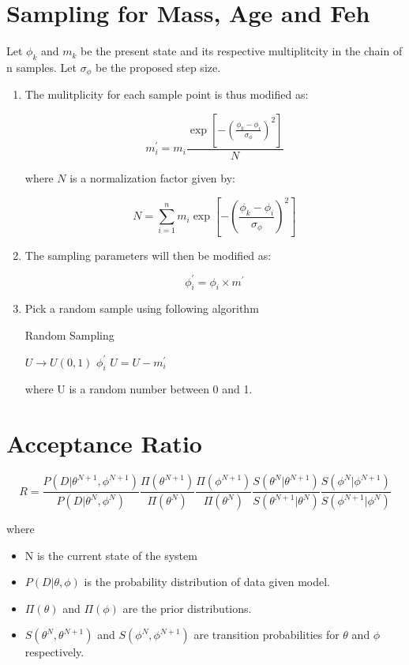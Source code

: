 \documentclass{article}
\begin{document}
\section{Sampling for Mass, Age and Feh}

Let $\phi_k$ and $m_k$ be the present state and its respective multiplitcity in the chain of n samples. Let $\sigma_{\phi}$ be the proposed step size. 

\begin{enumerate}
\item The mulitplicity for each sample point is thus modified as:

$$m_i^{\prime} = m_i  \dfrac{\exp \left[ -\left(\frac{\phi_k - \phi_i}{\sigma_{\phi}}\right)^2 \right]}{N}$$

where $N$ is a normalization factor given by:

$$N = \sum_{i=1}^n m_i  \exp \left[ -\left(\frac{\phi_k - \phi_i}{\sigma_{\phi}}\right)^2 \right]$$

\item The sampling parameters will then be modified as:

$$\phi_i^{\prime} = \phi_i \times m^{\prime}$$

\item Pick a random sample using following algorithm
\begin{algorithm}
\caption{Random Sampling}
\begin{algorithmic} 
\STATE $U \rightarrow U(0,1)$
		\RETURN $\phi_i^{\prime}$
	\ELSE \STATE  $U=U-m_i^{\prime}$
\ENDIF
\ENDFOR

\end{algorithmic}
\end{algorithm}

where U is a random number between 0 and 1.
\end{enumerate}

\newpage
\section{Acceptance Ratio}


$$R= \dfrac{P(D | \theta^{N+1},\phi^{N+1})}{P(D | \theta^{N},\phi^{N})}   \frac{\Pi(\theta^{N+1})}{ \Pi(\theta^{N})}   \frac{\Pi(\phi^{N+1})}{ \Pi(\theta^{N})} \frac{S(\theta^N | \theta^{N+1})}{S(\theta^{N+1} | \theta^{N})} \frac{S(\phi^N | \phi^{N+1})}{S(\phi^{N+1} | \phi^{N})}$$

where
\begin{itemize}
\item N is the current state of the system
\item $P(D | \theta, \phi)$ is the probability distribution of data given model.
\item $\Pi(\theta)$ and $\Pi(\phi)$ are the prior distributions.

\item $S(\theta^N,\theta^{N+1})$ and $S(\phi^N,\phi^{N+1})$  are transition probabilities for $\theta$ and $\phi$ respectively.
\end{itemize}
\end{document}
